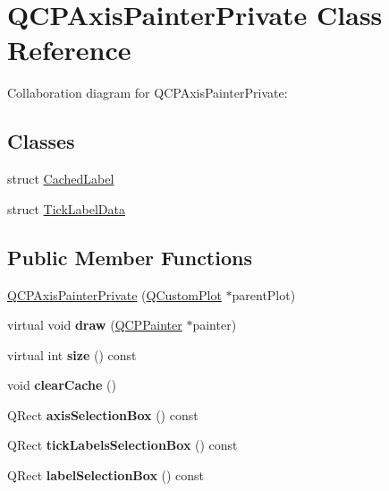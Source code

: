 \hypertarget{classQCPAxisPainterPrivate}{}\section{Q\+C\+P\+Axis\+Painter\+Private Class Reference}
\label{classQCPAxisPainterPrivate}


Collaboration diagram for Q\+C\+P\+Axis\+Painter\+Private\+:
\subsection*{Classes}
\begin{DoxyCompactItemize}
\item 
struct \hyperlink{structQCPAxisPainterPrivate_1_1CachedLabel}{Cached\+Label}
\item 
struct \hyperlink{structQCPAxisPainterPrivate_1_1TickLabelData}{Tick\+Label\+Data}
\end{DoxyCompactItemize}
\subsection*{Public Member Functions}
\begin{DoxyCompactItemize}
\item 
\hyperlink{classQCPAxisPainterPrivate_a0f14aa5c4aa83dbcd68984a7c73bf94f}{Q\+C\+P\+Axis\+Painter\+Private} (\hyperlink{classQCustomPlot}{Q\+Custom\+Plot} $\ast$parent\+Plot)
\item 
virtual void {\bfseries draw} (\hyperlink{classQCPPainter}{Q\+C\+P\+Painter} $\ast$painter)\hypertarget{classQCPAxisPainterPrivate_a0207a99bdf9c4f70af20928898ddc2fc}{}\label{classQCPAxisPainterPrivate_a0207a99bdf9c4f70af20928898ddc2fc}

\item 
virtual int {\bfseries size} () const \hypertarget{classQCPAxisPainterPrivate_a8b2dc0bd2ccbf6bd450733ec9e410a38}{}\label{classQCPAxisPainterPrivate_a8b2dc0bd2ccbf6bd450733ec9e410a38}

\item 
void {\bfseries clear\+Cache} ()\hypertarget{classQCPAxisPainterPrivate_a7b6806e32c44384fd0ae4dcdaa72b1b5}{}\label{classQCPAxisPainterPrivate_a7b6806e32c44384fd0ae4dcdaa72b1b5}

\item 
Q\+Rect {\bfseries axis\+Selection\+Box} () const \hypertarget{classQCPAxisPainterPrivate_aaf93529ac60215ea020cdff5635c3e80}{}\label{classQCPAxisPainterPrivate_aaf93529ac60215ea020cdff5635c3e80}

\item 
Q\+Rect {\bfseries tick\+Labels\+Selection\+Box} () const \hypertarget{classQCPAxisPainterPrivate_af02fc189ab8460c202eb4138c9aca516}{}\label{classQCPAxisPainterPrivate_af02fc189ab8460c202eb4138c9aca516}

\item 
Q\+Rect {\bfseries label\+Selection\+Box} () const \hypertarget{classQCPAxisPainterPrivate_ae907476bf8cf0ecd17620575e17c06b1}{}\label{classQCPAxisPainterPrivate_ae907476bf8cf0ecd17620575e17c06b1}

\end{DoxyCompactItemize}

